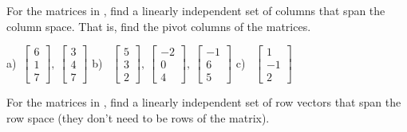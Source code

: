 \begin{exercise}
For the matrices in , find
a linearly independent set of columns that span the column space.
That is, find the pivot columns of the matrices.
\end{exercise}
\comboSol{%
}
{%
a)~$\left[\begin{smallmatrix} 6 \\ 1 \\ 7 \end{smallmatrix}\right],\ \left[\begin{smallmatrix} 3 \\ 4 \\ 7 \end{smallmatrix}\right]$ \quad b)~ $\left[\begin{smallmatrix} 5 \\ 3 \\2 \end{smallmatrix}\right],\ \left[\begin{smallmatrix} -2 \\ 0 \\ 4 \end{smallmatrix}\right],\ \left[\begin{smallmatrix} -1 \\ 6 \\ 5 \end{smallmatrix}\right]$ \quad c)~ $\left[\begin{smallmatrix} 1 \\ -1 \\2 \end{smallmatrix}\right]$
}

\begin{exercise}\ansMark%
For the matrices in , find
a linearly independent set of row vectors that span the row space
(they don't need to be rows of the matrix).
\end{exercise}

